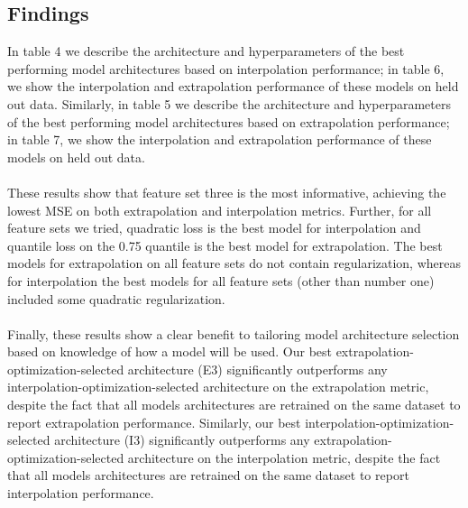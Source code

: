 \documentclass{article}
\begin{document}
\subsection{Findings}
In table 4 we describe the architecture and hyperparameters of the best performing model architectures based on interpolation performance; in table 6, we show the interpolation and extrapolation performance of these models on held out data. Similarly, in table 5 we describe the architecture and hyperparameters of the best performing model architectures based on extrapolation performance; in table 7, we show the interpolation and extrapolation performance of these models on held out data. \\\\
These results show that feature set three is the most informative, achieving the lowest MSE on both extrapolation and interpolation metrics. Further, for all feature sets we tried, quadratic loss is the best model for interpolation and quantile loss on the 0.75 quantile is the best model for extrapolation. The best models for extrapolation on all feature sets do not contain regularization, whereas for interpolation the best models for all feature sets (other than number one) included some quadratic regularization. \\\\
Finally, these results show a clear benefit to tailoring model architecture selection based on knowledge of how a model will be used. Our best extrapolation-optimization-selected architecture (E3) significantly outperforms any interpolation-optimization-selected architecture on the extrapolation metric, despite the fact that all models architectures are retrained on the same dataset to report extrapolation performance. Similarly, our best interpolation-optimization-selected architecture (I3) significantly outperforms any extrapolation-optimization-selected architecture on the interpolation metric, despite the fact that all models architectures are retrained on the same dataset to report interpolation performance.
\end{document}
